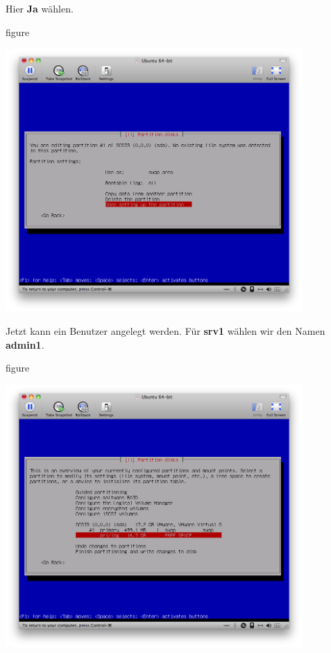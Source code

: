 Hier \textbf{Ja} wählen.

\begin{nofloat}{figure}
\begin{center}
\includegraphics[width=0.85\textwidth]{screenshots/20_ubuntu_install.png}
\end{center}
\end{nofloat}

\pagebreak
Jetzt kann ein Benutzer angelegt werden. Für \textbf{srv1} wählen wir den Namen \textbf{admin1}.

\begin{nofloat}{figure}
\begin{center}
\includegraphics[width=0.85\textwidth]{screenshots/21_ubuntu_install.png}
\end{center}
\end{nofloat}

